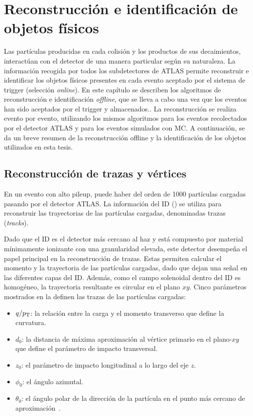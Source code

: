 \chapter{Reconstrucci\'on e identificaci\'on de objetos f\'isicos}
\label{ch:objects}


Las partículas producidas en cada colisión y los productos de sus decaimientos, interactúan con el detector de una manera particular según su naturaleza. La información recogida por todos los subdetectores de \ac{ATLAS} permite reconstruir e identificar los objetos físicos presentes en cada evento aceptado por el sistema de trigger (selecci\'on \textit{online}). En este cap\'itulo se describen los algoritmos de reconstrucción e identificación \textit{offline}, que se lleva a cabo una vez que los eventos han sido aceptados por el trigger y almacenados.. La reconstrucción se realiza evento por evento, utilizando los mismos algoritmos para los eventos recolectados por el detector \ac{ATLAS} y para los eventos simulados con \acf{MC}. A continuación, se da un breve resumen de la reconstrucción offline y la identificación de los objetos utilizados en esta tesis.




\section{Reconstrucci\'on de trazas y v\'ertices}

En un evento con alto pileup, puede haber del orden de 1000 partículas cargadas pasando por el detector \ac{ATLAS}. La información del \ac{ID} (\Sect{\ref{subsec:atlas:atlas:id}}) se utiliza para reconstruir las trayectorias de las partículas cargadas, denominadas trazas (\textit{tracks}).

Dado que el \ac{ID} es el detector más cercano al haz y está compuesto por material mínimamente ionizante con una granularidad elevada, este detector desempeña el papel principal en la reconstrucción de trazas. Estas permiten calcular el momento y la trayectoria de las partículas cargadas, dado que dejan una se\~nal en las diferentes capas del \ac{ID}. Adem\'as, como el campo solenoidal dentro del \ac{ID} es homogéneo, la trayectoria resultante es circular en el plano \(xy\). Cinco parámetros mostrados en la \Fig{\ref{fig:objects:track_vtx:track_parameters}} definen las trazas de las partículas cargadas:
\begin{itemize}
    \item \(q/p_{\text{T}}\): la relación entre la carga y el momento transverso que define la curvatura.
    \item \(d_0\): la distancia de máxima aproximación al vértice primario en el plano-\(xy\) que define el parámetro de impacto transversal.
    \item \(z_0\): el parámetro de impacto longitudinal a lo largo del eje \(z\).
    \item \(\phi_0\): el ángulo azimutal.
    \item \(\theta_0\): el ángulo polar de la dirección de la partícula en el punto más cercano de aproximación~\cite{ATLAS-Tracks-Performance-Run2}.
\end{itemize}

